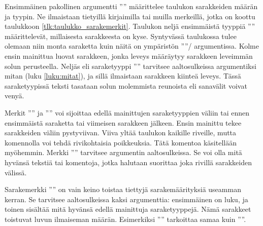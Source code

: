 Ensimmäinen pakollinen argumentti '''' määrittelee
taulukon sarakkeiden määrän ja tyypin. Ne ilmaistaan tietyillä
kirjaimilla tai muilla merkeillä, jotka on koottu taulukkoon
\ref{tlk:taulukko_sarakemerkit}. Taulukon neljä ensimmäistä tyyppiä
'''' määrittelevät, millaisesta sarakkeesta on kyse.
Syntyvässä taulukossa tulee olemaan niin monta saraketta kuin näitä on
ympäristön ''''\-/ argumentissa. Kolme ensin mainittua
luovat sarakkeen, jonka leveys määräytyy sarakkeen leveimmän solun
perusteella. Neljäs eli saraketyyppi '''' tarvitsee
aaltosulkeissa argumentiksi mitan (luku \ref{luku:mitat}), ja sillä
ilmaistaan sarakkeen kiinteä leveys. Tässä saraketyypissä teksti
tasataan solun molemmista reunoista eli sanavälit voivat venyä.

Merkit ''\koodi{|}'' ja '''' voi sijoittaa edellä mainittujen
saraketyyppien väliin tai ennen ensimmäistä saraketta tai viimeisen
sarakkeen jälkeen. Ensin mainittu tekee sarakkeiden väliin pystyviivan.
Viiva yltää taulukon kaikille riveille, mutta komennolla
 voi tehdä rivikohtaisia poikkeuksia. Tätä komentoa
käsitellään myöhemmin. Merkki '''' tarvitsee argumentin
aaltosulkeissa. Se voi olla mitä hyvänsä tekstiä tai komentoja, jotka
halutaan suorittaa joka rivillä sarakkeiden välissä.

Sarakemerkki ''\koodi{*}'' on vain keino toistaa tiettyjä
sarakemäärityksiä useamman kerran. Se tarvitsee aaltosulkeissa kaksi
argumenttia: ensimmäinen on luku, ja toinen sisältää mitä hyvänsä edellä
mainittuja saraketyyppejä. Nämä sarakkeet toistuvat luvun ilmaiseman
määrän. Esimerkiksi '''' tarkoittaa samaa kuin
''''.

